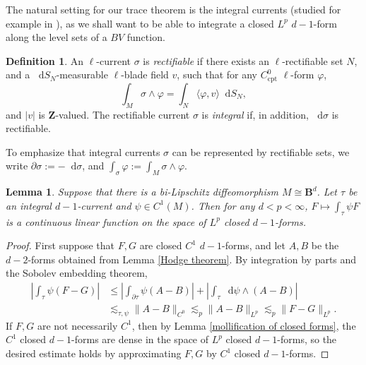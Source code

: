 \documentclass[reqno,11pt]{amsart}
\newcommand{\ZZ}{\mathbf{Z}}
\newcommand{\Ball}{\mathbf{B}}
\newcommand*\dif{\mathop{}\!\mathrm{d}}
\newcommand{\dfn}[1]{\emph{#1}\index{#1}}
\newcommand{\cpt}{\mathrm{cpt}}
\newtheorem{lemma}[theorem]{Lemma}
\theoremstyle{definition}
\newtheorem{definition}[theorem]{Definition}
\numberwithin{equation}{section}
\begin{document}
The natural setting for our trace theorem is the integral currents (studied for example in \cite[\S27]{Simon84}), as we shall want to be able to integrate a closed $L^p$ $d - 1$-form along the level sets of a $BV$ function.

\begin{definition}
An $\ell$-current $\sigma$ is \dfn{rectifiable} if there exists an $\ell$-rectifiable set $N$, and a $\dif S_N$-measurable $\ell$-blade field $v$, such that for any $C^0_\cpt$ $\ell$-form $\varphi$,
$$\int_M \sigma \wedge \varphi = \int_N \langle \varphi, v\rangle \dif S_N,$$
and $|v|$ is $\ZZ$-valued.
The rectifiable current $\sigma$ is \dfn{integral} if, in addition, $\dif \sigma$ is rectifiable.
\end{definition}

To emphasize that integral currents $\sigma$ can be represented by rectifiable sets, we write $\partial \sigma := -\dif \sigma$, and $\int_\sigma \varphi := \int_M \sigma \wedge \varphi$.

\begin{lemma}\label{local trace theorem}
Suppose that there is a bi-Lipschitz diffeomorphism $M \cong \Ball^d$.
Let $\tau$ be an integral $d - 1$-current and $\psi \in C^1(M)$.
Then for any $d < p < \infty$, $F \mapsto \int_\tau \psi F$ is a continuous linear function on the space of $L^p$ closed $d - 1$-forms.
\end{lemma}
\begin{proof}
First suppose that $F, G$ are closed $C^1$ $d - 1$-forms, and let $A, B$ be the $d - 2$-forms obtained from Lemma \ref{Hodge theorem}.
By integration by parts and the Sobolev embedding theorem,
\begin{align*}
	\left|\int_\tau \psi(F - G)\right| 
	&\leq \left|\int_{\partial \tau} \psi (A - B)\right| + \left|\int_\tau \dif \psi \wedge (A - B)\right| \\
	&\lesssim_{\tau, \psi} \|A - B\|_{C^0} \lesssim_p \|A - B\|_{L^p} \lesssim_p \|F - G\|_{L^p}.
\end{align*}
If $F, G$ are not necessarily $C^1$, then by Lemma \ref{mollification of closed forms}, the $C^1$ closed $d - 1$-forms are dense in the space of $L^p$ closed $d - 1$-forms, so the desired estimate holds by approximating $F, G$ by $C^1$ closed $d - 1$-forms.
\end{proof}
\end{document}
